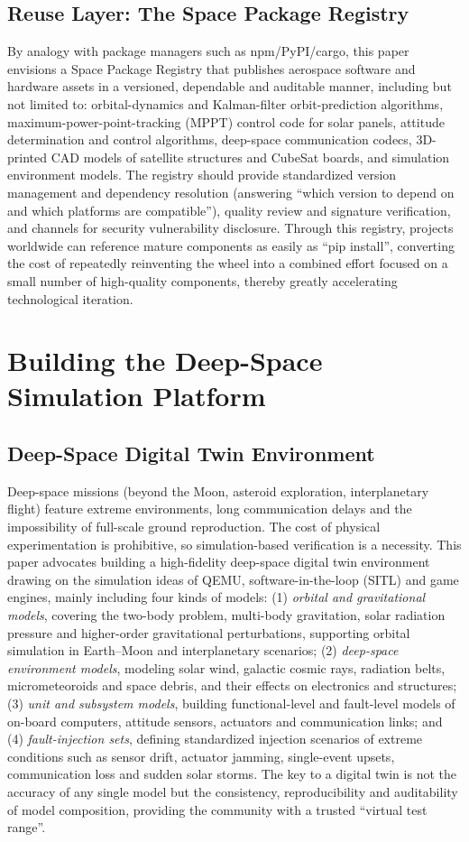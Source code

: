 \documentclass[11pt]{article}
\begin{document}
\subsection{Reuse Layer: The Space Package Registry}
By analogy with package managers such as npm/PyPI/cargo, this paper envisions a Space Package Registry that publishes aerospace software and hardware assets in a versioned, dependable and auditable manner, including but not limited to: orbital-dynamics and Kalman-filter orbit-prediction algorithms, maximum-power-point-tracking (MPPT) control code for solar panels, attitude determination and control algorithms, deep-space communication codecs, 3D-printed CAD models of satellite structures and CubeSat boards, and simulation environment models. The registry should provide standardized version management and dependency resolution (answering ``which version to depend on and which platforms are compatible''), quality review and signature verification, and channels for security vulnerability disclosure. Through this registry, projects worldwide can reference mature components as easily as ``pip install'', converting the cost of repeatedly reinventing the wheel into a combined effort focused on a small number of high-quality components, thereby greatly accelerating technological iteration.

\section{Building the Deep-Space Simulation Platform}
\subsection{Deep-Space Digital Twin Environment}
Deep-space missions (beyond the Moon, asteroid exploration, interplanetary flight) feature extreme environments, long communication delays and the impossibility of full-scale ground reproduction. The cost of physical experimentation is prohibitive, so simulation-based verification is a necessity. This paper advocates building a high-fidelity deep-space digital twin environment drawing on the simulation ideas of QEMU, software-in-the-loop (SITL) and game engines, mainly including four kinds of models: (1) \emph{orbital and gravitational models}, covering the two-body problem, multi-body gravitation, solar radiation pressure and higher-order gravitational perturbations, supporting orbital simulation in Earth--Moon and interplanetary scenarios; (2) \emph{deep-space environment models}, modeling solar wind, galactic cosmic rays, radiation belts, micrometeoroids and space debris, and their effects on electronics and structures; (3) \emph{unit and subsystem models}, building functional-level and fault-level models of on-board computers, attitude sensors, actuators and communication links; and (4) \emph{fault-injection sets}, defining standardized injection scenarios of extreme conditions such as sensor drift, actuator jamming, single-event upsets, communication loss and sudden solar storms. The key to a digital twin is not the accuracy of any single model but the consistency, reproducibility and auditability of model composition, providing the community with a trusted ``virtual test range''.
\end{document}
